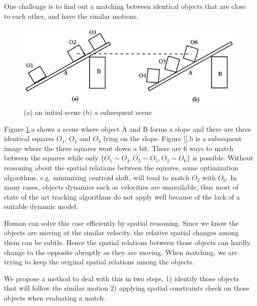\documentclass[letterpaper]{article}
\begin{document}
One challenge is to find out a matching between identical objects that are close to each other, and have the similar motions.  
\begin{figure}[h!]\label{SCOExample_2}
\centering\includegraphics[scale=0.3]{SCOScenario_2.png}\caption{(a) an initial scene (b) a subsequent scene}
\end{figure}
Figure \ref{SCOExample_2}.a  shows a scene where object A and B forms a slope and there are three identical squares $O_1$, $O_2$ and $O_3$ lying on the slope. Figure \ref{}.b is a subsequent image where the three squares went down a bit. There are 6 ways to match between the squares while only $\{O_1 \sim O_4, O_2 \sim O_5, O_3 \sim O_6\}$ is possible. Without reasoning about the spatial relations between the squares, some optimization algorithms, e.g. minimizing centroid shift, will tend to match $O_2$ with $O_6$. In many cases, objects dynamics such as velocities are unavailable, thus most of state of the art tracking algorithms do not apply well because of the lack of a suitable dynamic model. 

Human can solve this case efficiently by spatial reasoning. Since we know the objects are moving at the similar velocity, the relative spatial changes among them can be subtle. Hence the spatial relations between those objects can hardly change to the opposite abruptly as they are moving. When matching, we are trying to keep the original spatial relations among the objects. 

We propose a method to deal with this in two steps, 1) identify those objects that will follow the similar motion 2) applying spatial constraints check on those objects when evaluating a match. 
\end{document}
